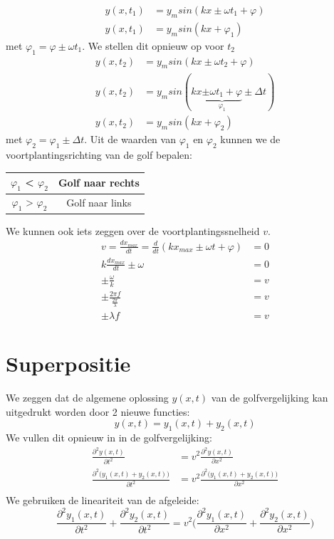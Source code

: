 \documentclass[a4paper,kul]{kulakarticle} %
\begin{document}
\begin{align}
	y(x,t_1) &= y_msin(kx \pm \omega t_1 +\varphi)\\
	\label{eq:ruimteanalyse1}
	y(x,t_1) &= y_msin(kx +\varphi_1)
\end{align}
met $\varphi_1 = \varphi \pm \omega t_1$. We stellen dit opnieuw op voor $t_2$
\begin{align}
	y(x,t_2) &= y_msin(kx \pm \omega t_2 +\varphi)\\
	y(x,t_2) &= y_msin(kx \underbrace{\pm \omega t_1 +\varphi}_{\varphi_1}\pm\Delta t)\\
	\label{eq:ruimteanalyse2}
	y(x,t_2) &= y_msin(kx +\varphi_2)
\end{align}
met $\varphi_2 = \varphi_1\pm\Delta t$.
Uit de waarden van $\varphi_1$ en $\varphi_2$ kunnen we de voortplantingsrichting van de golf bepalen: 
\begin{center}
	\begin{tabular}{|c|c|}
		\hline
		$\varphi_1$ < $\varphi_2$& Golf naar rechts \\
		\hline
		$\varphi_1$ > $\varphi_2$& Golf naar links \\
		\hline
	\end{tabular} 
\end{center}
We kunnen ook iets zeggen over de voortplantingssnelheid $v$.
\begin{align*}
 v = \frac{dx_{max}}{dt} = \frac{d}{dt}(kx_{max} \pm \omega t +\varphi) &= 0\\
 k\frac{dx_{max}}{dt}\pm \omega & = 0\\
 \pm \frac{\omega}{k} & = v\\
 \pm\frac{2\pi f}{\frac{2\pi}{\lambda}} & = v\\
 \pm \lambda f & = v
\end{align*}
\newpage
\section{Superpositie}
We zeggen dat de algemene oplossing $y(x,t)$ van de golfvergelijking kan uitgedrukt worden door 2 nieuwe functies:
\begin{equation*}
	y(x,t) = y_1(x,t)+y_2(x,t)
\end{equation*}
We vullen dit opnieuw in in de golfvergelijking:
\begin{align*}
	\frac{\partial^2 y(x,t)}{\partial t^2} & = v^2 \frac{\partial^2 y(x,t)}{\partial x^2}\\
	\frac{\partial^2 \big( y_1(x,t)+y_2(x,t) \big)}{\partial t^2} & = v^2 \frac{\partial^2 \big(y_1(x,t)+y_2(x,t)\big)}{\partial x^2}\\
\end{align*}
We gebruiken de lineariteit van de afgeleide:
\begin{equation*}
	\frac{\partial^2 y_1(x,t)}{\partial t^2} +\frac{\partial^2 y_2(x,t)}{\partial t^2}  = v^2\Bigg(\frac{\partial^2 y_1(x,t)}{\partial x^2}+\frac{\partial^2 y_2(x,t)}{\partial x^2}\Bigg)
\end{equation*}
\newpage
\end{document}
